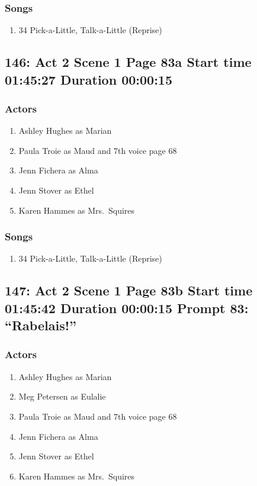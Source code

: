 \subsubsection{Songs}
\begin{enumerate}
\item 34 Pick-a-Little, Talk-a-Little (Reprise)
\end{enumerate}
\subsection{146: Act 2 Scene 1 Page 83a Start time 01:45:27 Duration 00:00:15}

\subsubsection{Actors}
\begin{enumerate}
\item Ashley Hughes as Marian
\item Paula Troie as Maud and 7th voice page 68
\item Jenn Fichera as Alma
\item Jenn Stover as Ethel
\item Karen Hammes as Mrs.~Squires
\end{enumerate}

\subsubsection{Songs}
\begin{enumerate}
\item 34 Pick-a-Little, Talk-a-Little (Reprise)
\end{enumerate}
\subsection{147: Act 2 Scene 1 Page 83b Start time 01:45:42 Duration 00:00:15 Prompt 83: ``Rabelais!''}

\subsubsection{Actors}
\begin{enumerate}
\item Ashley Hughes as Marian
\item Meg Petersen as Eulalie
\item Paula Troie as Maud and 7th voice page 68
\item Jenn Fichera as Alma
\item Jenn Stover as Ethel
\item Karen Hammes as Mrs.~Squires
\end{enumerate}

